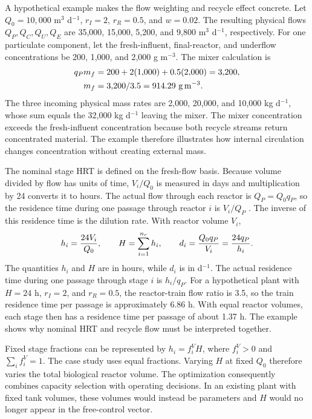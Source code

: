 A hypothetical example makes the flow weighting and recycle effect concrete. Let $Q_0=10{,}000$ m$^3$ d$^{-1}$, $r_I=2$, $r_R=0.5$, and $w=0.02$. The resulting physical flows $Q_P,Q_C,Q_U,Q_E$ are 35{,}000, 15{,}000, 5{,}200, and 9{,}800 m$^3$ d$^{-1}$, respectively. For one particulate component, let the fresh-influent, final-reactor, and underflow concentrations be 200, 1{,}000, and 2{,}000 g m$^{-3}$. The mixer calculation is
\begin{align}
\equationname{Illustrative component inventory entering the mixer}
q_Pm_f&=200+2(1{,}000)+0.5(2{,}000)=3{,}200,\\
\equationname{Illustrative mixer concentration after flow normalization}
m_f&=3{,}200/3.5=914.29\ \mathrm{g\,m^{-3}}.
\end{align}
The three incoming physical mass rates are 2{,}000, 20{,}000, and 10{,}000 kg d$^{-1}$, whose sum equals the 32{,}000 kg d$^{-1}$ leaving the mixer. The mixer concentration exceeds the fresh-influent concentration because both recycle streams return concentrated material. The example therefore illustrates how internal circulation changes concentration without creating external mass.

The nominal stage HRT is defined on the fresh-flow basis. Because volume divided by flow has units of time, $V_i/Q_0$ is measured in days and multiplication by 24 converts it to hours. The actual flow through each reactor is $Q_P=Q_0q_P$, so the residence time during one passage through reactor $i$ is $V_i/Q_P$ \citep{Henze2008,Alex2008}. The inverse of this residence time is the dilution rate. With reactor volume $V_i$,
\begin{equation}
\equationname{Stage retention times and recycle-adjusted dilution rates}
h_i=\frac{24V_i}{Q_0},\qquad H=\sum_{i=1}^{n_r}h_i,\qquad
d_i=\frac{Q_0q_P}{V_i}=\frac{24q_P}{h_i}.
\label{eq:plant_residence}
\end{equation}
The quantities $h_i$ and $H$ are in hours, while $d_i$ is in d$^{-1}$. The actual residence time during one passage through stage $i$ is $h_i/q_P$. For a hypothetical plant with $H=24$ h, $r_I=2$, and $r_R=0.5$, the reactor-train flow ratio is 3.5, so the train residence time per passage is approximately 6.86 h. With equal reactor volumes, each stage then has a residence time per passage of about 1.37 h. The example shows why nominal HRT and recycle flow must be interpreted together.

Fixed stage fractions can be represented by $h_i=f_i^V H$, where $f_i^V>0$ and $\sum_i f_i^V=1$. The case study uses equal fractions. Varying $H$ at fixed $Q_0$ therefore varies the total biological reactor volume. The optimization consequently combines capacity selection with operating decisions. In an existing plant with fixed tank volumes, these volumes would instead be parameters and $H$ would no longer appear in the free-control vector.

